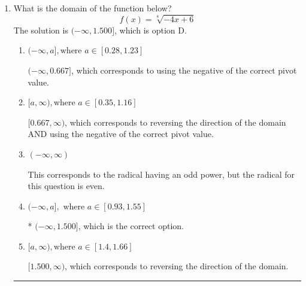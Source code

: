 \documentclass{extbook}[14pt]
\newcommand{\litem}[1]{\item #1

\rule{\textwidth}{0.4pt}}
\begin{document}
\begin{enumerate}\litem{
What is the domain of the function below?
\[ f(x) = \sqrt[8]{-4 x + 6} \]The solution is \( (-\infty, 1.500] \), which is option D.\begin{enumerate}[label=\Alph*.]
\item \( (-\infty, a], \text{where } a \in [0.28, 1.23] \)

$(-\infty, 0.667]$, which corresponds to using the negative of the correct pivot value.
\item \( [a, \infty), \text{where } a \in [0.35, 1.16] \)

$[0.667, \infty)$, which corresponds to reversing the direction of the domain AND using the negative of the correct pivot value.
\item \( (-\infty, \infty) \)

This corresponds to the radical having an odd power, but the radical for this question is even.
\item \( (-\infty, a], \text{ where } a \in [0.93, 1.55] \)

* $(-\infty, 1.500]$, which is the correct option.
\item \( [a, \infty), \text{where } a \in [1.4, 1.66] \)

 $[1.500, \infty)$, which corresponds to reversing the direction of the domain.
\end{enumerate}

}
\end{enumerate}
\end{document}
